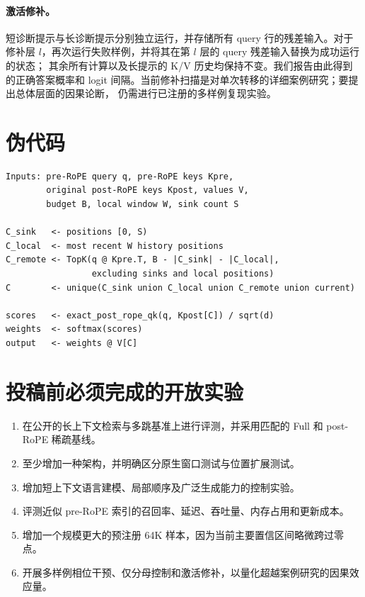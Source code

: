 \paragraph{激活修补。}
短诊断提示与长诊断提示分别独立运行，并存储所有 query 行的残差输入。对于修补层
$l$，再次运行失败样例，并将其在第 $l$ 层的 query 残差输入替换为成功运行的状态；
其余所有计算以及长提示的 K/V 历史均保持不变。我们报告由此得到的正确答案概率和
logit 间隔。当前修补扫描是对单次转移的详细案例研究；要提出总体层面的因果论断，
仍需进行已注册的多样例复现实验。

\section{伪代码}
\label{app:pseudocode}

\begin{verbatim}
Inputs: pre-RoPE query q, pre-RoPE keys Kpre,
        original post-RoPE keys Kpost, values V,
        budget B, local window W, sink count S

C_sink   <- positions [0, S)
C_local  <- most recent W history positions
C_remote <- TopK(q @ Kpre.T, B - |C_sink| - |C_local|,
                 excluding sinks and local positions)
C        <- unique(C_sink union C_local union C_remote union current)

scores   <- exact_post_rope_qk(q, Kpost[C]) / sqrt(d)
weights  <- softmax(scores)
output   <- weights @ V[C]
\end{verbatim}

\section{投稿前必须完成的开放实验}
\label{app:todos}

\begin{enumerate}
  \item 在公开的长上下文检索与多跳基准上进行评测，并采用匹配的 Full 和 post-RoPE
  稀疏基线。
  \item 至少增加一种架构，并明确区分原生窗口测试与位置扩展测试。
  \item 增加短上下文语言建模、局部顺序及广泛生成能力的控制实验。
  \item 评测近似 pre-RoPE 索引的召回率、延迟、吞吐量、内存占用和更新成本。
  \item 增加一个规模更大的预注册 64K 样本，因为当前主要置信区间略微跨过零点。
  \item 开展多样例相位干预、仅分母控制和激活修补，以量化超越案例研究的因果效应量。
\end{enumerate}
